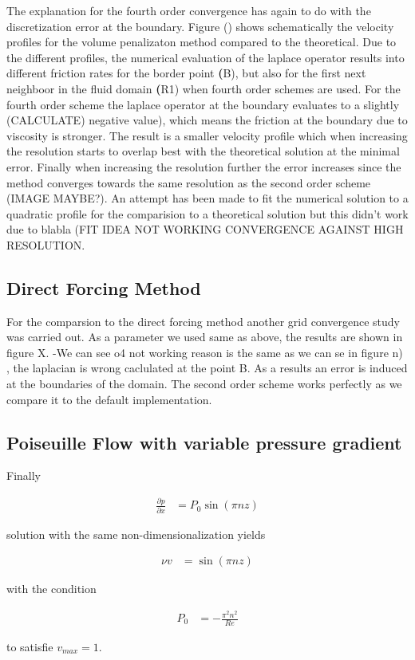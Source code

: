 The explanation for the fourth order convergence has again to do with the discretization error at the boundary.
Figure () shows schematically the velocity profiles for the volume penalizaton method compared to the theoretical.
Due to the different  profiles, the numerical evaluation of the laplace operator results
into different friction rates for the border point \textbf(B), but  also for the first next neighboor in the fluid domain \textbf(R1) when fourth order schemes are used.
For the fourth order scheme the laplace operator at the boundary evaluates to a slightly (CALCULATE) negative value), which means the friction at the boundary due to
viscosity is stronger. The result is a smaller velocity profile which when increasing the resolution starts to overlap best with the theoretical solution at the minimal error.
Finally when increasing the resolution further the error increases since the method converges towards the same resolution as the second order scheme (IMAGE MAYBE?).
An attempt has been made to fit the numerical solution to a quadratic profile for the comparision to a theoretical solution but this didn't work due to blabla
(FIT IDEA NOT WORKING CONVERGENCE AGAINST HIGH RESOLUTION.

\subsection{Direct Forcing Method}

For the comparsion to the direct forcing method another grid convergence study was carried out.  As a parameter we used same as above, the results are shown in figure X.
-We can see o4 not working reason is the same as we can se in figure n) , the laplacian is wrong caclulated at the point B.
As a results an error is induced at the boundaries of the domain.
The second order scheme works perfectly as we compare it to the default implementation.

\subsection{Poiseuille Flow with variable pressure gradient}

Finally

\begin{align}
\frac{\partial p}{\partial x} &= P_0 \sin(\pi n z)
\end{align}

solution with the same non-dimensionalization yields

\begin{align}
 \nu v &=  \sin(\pi n z)
\end{align}

with the condition

\begin{align}
 P_0 &= -\frac{\pi^2n^2}{Re}
\end{align}

to satisfie $v_{max} = 1$.


